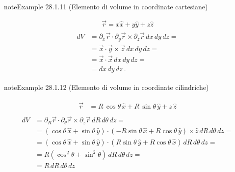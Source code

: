 \documentclass[letterpaper,10pt,italian]{jupyterBook}
\begin{document}
\label{ch/vector-calculus/geometry:example-14}
\begin{sphinxadmonition}{note}{Example 28.1.11 (Elemento di volume in coordinate cartesiane)}


\begin{equation*}
\begin{split}\vec{r} = x \hat{x} + y \hat{y} + z \hat{z}\end{split}
\end{equation*}\begin{equation*}
\begin{split}\begin{aligned}
  d V
  & = \partial_x \vec{r} \cdot \partial_y \vec{r} \times \partial_z \vec{r} \, dx \, dy \, dz = \\
  & = \vec{x} \cdot \vec{y} \times \vec{z} \, dx \, dy \, dz = \\
  & = \vec{x} \cdot \vec{x} \, dx \, dy \, dz = \\
  & = dx \, dy \, dz \ .
\end{aligned}\end{split}
\end{equation*}\end{sphinxadmonition}
\label{ch/vector-calculus/geometry:example-15}
\begin{sphinxadmonition}{note}{Example 28.1.12 (Elemento di volume in coordinate cilindriche)}


\begin{equation*}
\begin{split}\begin{aligned}
  \vec{r}
  & = R \, \cos \theta \, \hat{x} + R \, \sin \theta \, \hat{y} + z \, \hat{z} 
\end{aligned}\end{split}
\end{equation*}\begin{equation*}
\begin{split}\begin{aligned}
  d V
  & = \partial_R \vec{r} \cdot \partial_{\theta} \vec{r} \times \partial_{z} \vec{r} \, dR \, d\theta \, d z = \\
  & = (\cos \theta \, \hat{x} + \sin \theta \, \hat{y}) \cdot (-R \sin \theta \, \hat{x} + R \cos \theta \, \hat{y}) \times \hat{z}  \, dR \, d\theta \, d z = \\
  & = (\cos \theta \, \hat{x} + \sin \theta \, \hat{y}) \cdot ( R \sin \theta \, \hat{y} + R \cos \theta \, \hat{x}) \, dR \, d\theta \, d z = \\
  & = R (\cos^2 \theta + \sin^2 \theta) \, dR \, d\theta \, d z = \\
  & = R \, dR \, d \theta \, dz 
\end{aligned}\end{split}
\end{equation*}\end{sphinxadmonition}
\end{document}
